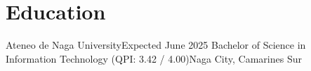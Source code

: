 \section{Education}

\resumeSubHeadingListStart
    \resumeSubheading
    {Ateneo de Naga University}{Expected June 2025}
    {Bachelor of Science in Information Technology (QPI: 3.42 / 4.00)}{Naga City, Camarines Sur}
\resumeSubHeadingListEnd
